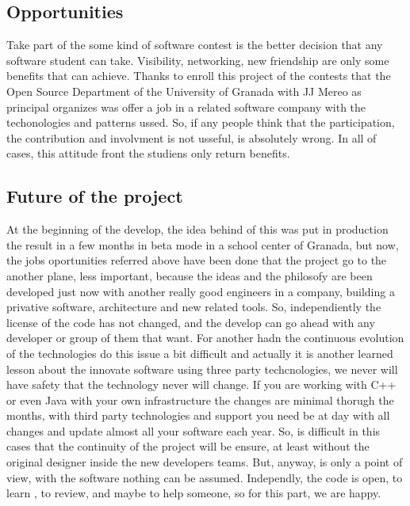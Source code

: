 \subsection{Opportunities}

Take part of the some kind of software contest is the better decision that any
software student can take. Visibility, networking, new friendship are only some
benefits that can achieve.
Thanks to enroll this project of the contests that the Open Source Department of
 the University of Granada with JJ Mereo as principal organizes was offer a job
 in a related software company with the techonologies and patterns ussed.
So, if any people think that the participation, the contribution and involvment
is not usseful, is absolutely wrong. In all of cases, this attitude front the
studiens only return benefits.

\subsection{Future of the project}

At the beginning of the develop, the idea behind of this was put in production
the result in a few months in beta mode in a school center of Granada, but now,
the jobs oportunities referred above have been done that the project go to the
another plane, less important, because the ideas and the philosofy are been
developed just now with another really good engineers in a company, building a
privative software, architecture and new related tools.
\linebreak
\linebreak
\noindent So, independiently the license of the code has not changed, and the develop can
go ahead with any developer or group of them that want. For another hadn the
continuous evolution of the technologies do this issue a
bit difficult and actually it is another learned lesson about the innovate
software using three party techcnologies, we never will have safety that the
technology never will change. If you are working with C++ or even Java with your
own infrastructure the changes are minimal thorugh the months, with third party
technologies and support you need be at day with all changes and update almost
all your software each year. So, is difficult in this cases that the continuity
of the project will be ensure, at least without the original designer inside the
new developers teams. But, anyway, is only a point of view, with the software
nothing can be assumed.
\linebreak
\linebreak
\noindent Independly, the code is open, to learn , to review, and maybe to help someone,
so for this part, we are happy.

